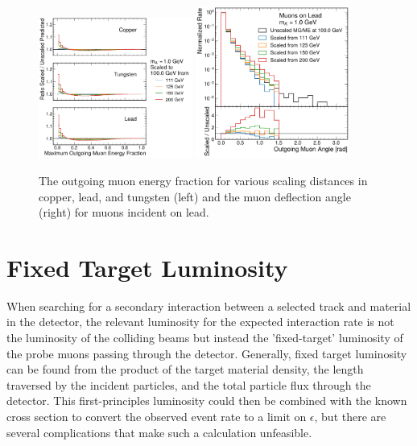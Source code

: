 \begin{figure}[!htbp]
    \centering
    \includegraphics[width=0.45\textwidth]{figures/muon_efrac_cumulative_ratio.pdf}
    \hspace{0.01\textwidth}
    \includegraphics[width=0.45\textwidth]{figures/muon_lead_ang.pdf}
    \caption[
        Validation of simulated \dbrem kinematics.
    ]{
        The outgoing muon energy fraction for various scaling distances in copper, lead, and tungsten (left) and the muon deflection angle (right) for muons incident on lead.
    }
    \label{fig:dbrem_validation}
\end{figure}

\section{Fixed Target Luminosity}
\label{sec:fixedLumi}
When searching for a secondary interaction between a selected track and material in the detector, the relevant luminosity for the expected interaction rate is not the luminosity of the colliding beams but instead the 'fixed-target' luminosity of the probe muons passing through the detector.
Generally, fixed target luminosity can be found from the product of the target material density, the length traversed by the incident particles, and the total particle flux through the detector.
This first-principles luminosity could then be combined with the known \dbrem cross section to convert the observed event rate to a limit on $\epsilon$, but there are several complications that make such a calculation unfeasible.

